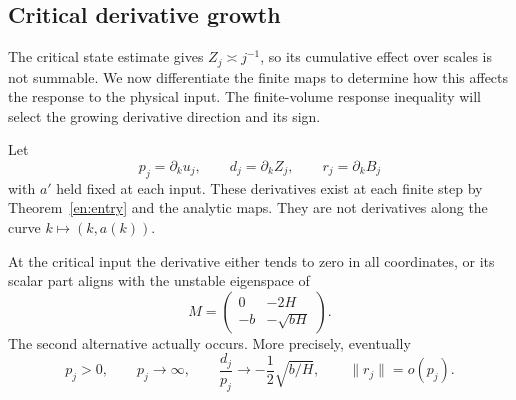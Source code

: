 \subsection{Critical derivative growth}

The critical state estimate gives $Z_j\asymp j^{-1}$, so its cumulative
effect over scales is not summable.  We now differentiate the finite
maps to determine how this affects the response to the physical input.
The finite-volume response inequality will select the growing
derivative direction and its sign.

Let
\[
 p_j=\partial_k u_j,\qquad d_j=\partial_k Z_j,\qquad
 r_j=\partial_k B_j
\]
with $a'$ held fixed at each input.  These derivatives exist
at each finite step by Theorem~\ref{en:entry} and the
analytic maps.  They are not derivatives along the curve
$k\mapsto(k,a(k))$.

\begin{lemma}
\label{ep:derivative-dichotomy}
At the critical input the derivative either tends to zero
in all coordinates, or its scalar part aligns with the
unstable eigenspace of
\begin{equation}\label{ep:critical-matrix}
 M=\begin{pmatrix}0&-2H\\-b&-\sqrt{bH}\end{pmatrix}.
\end{equation}
The second alternative actually occurs.  More precisely,
eventually
\begin{equation}\label{ep:critical-response-sign}
 p_j>0,\qquad p_j\longrightarrow\infty,\qquad
 \frac{d_j}{p_j}\longrightarrow-\frac12\sqrt{b/H},
 \qquad \|r_j\|=o(p_j).
\end{equation}
\end{lemma}

